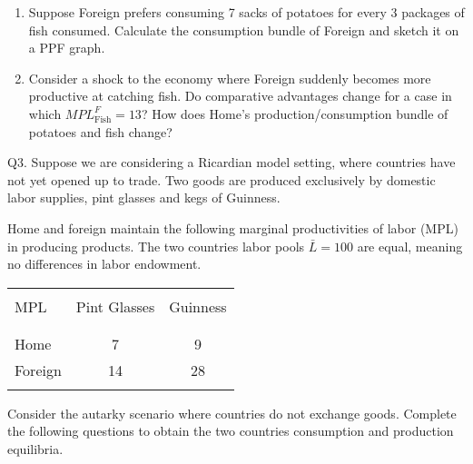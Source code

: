 \documentclass[12pt]{article}
\begin{document}
\begin{enumerate}[1)]
\bigskip

\bigskip

\bigskip

\bigskip

\bigskip  


\newpage

\item Suppose Foreign prefers consuming 7 sacks of potatoes for every 3 packages of fish consumed. Calculate the consumption bundle of Foreign and sketch it on a PPF graph.

\vspace{2in}

\item Consider a shock to the economy where Foreign suddenly becomes more productive at catching fish. Do comparative advantages change for a case in which $MPL^F_{\text{Fish}}=13$?
How does Home's production/consumption bundle of potatoes and fish change?

\vspace{4in}

\end{enumerate}

\newpage


\noindent Q3. Suppose we are considering a Ricardian model setting, where countries have not yet opened up to trade.
Two goods are produced exclusively by domestic labor supplies, pint glasses and kegs of Guinness. 

\noindent Home and foreign maintain the following marginal productivities of labor (MPL) in producing products. The two countries labor pools $\bar{L}=100$ are equal, meaning no differences in labor endowment. 

\begin{table}[!h]
	\centering
	\begin{tabular}[t]{l c c }
		\hline
		&&\\
		MPL & Pint Glasses & Guinness  \\
		&&\\
		\hline
		&&\\
		Home & 7 & 9  \\
		Foreign & 14 & 28 \\
		&&\\
		\hline
	\end{tabular}
\end{table}



Consider the autarky scenario where countries do not exchange goods. Complete the following questions to obtain the two countries consumption and production equilibria. 
\end{document}
